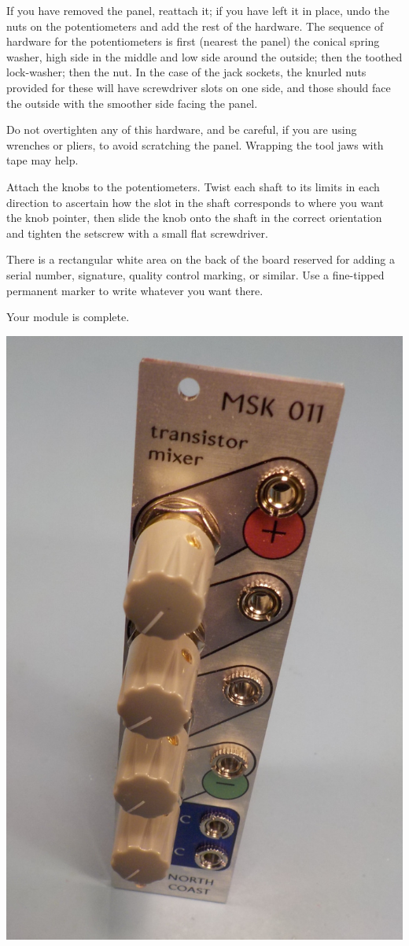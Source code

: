 If you have removed the panel, reattach it; if you have left it in place,
undo the nuts on the potentiometers and add the rest of the hardware.
The sequence of hardware for the potentiometers is first (nearest
the panel) the conical spring washer, high side in the middle and low side
around the outside; then the toothed lock-washer; then the nut.
In the case of the jack sockets, the knurled nuts provided for these will
have screwdriver slots on one side, and those should face the outside with
the smoother side facing the panel.

Do not overtighten any of this hardware, and be careful, if you are
using wrenches or pliers, to avoid scratching the panel.  Wrapping the tool
jaws with tape may help.

Attach the knobs to the potentiometers.  Twist each shaft to its limits in
each direction to ascertain how the slot in the shaft corresponds to where
you want the knob pointer, then slide the knob onto the shaft in the correct
orientation and tighten the setscrew with a small flat screwdriver.

There is a rectangular white area on the back of the board
reserved for adding a serial number, signature, quality control marking, or
similar.  Use a fine-tipped permanent marker to write whatever you want
there.

Your module is complete.

\nopagebreak
\noindent\includegraphics[width=\linewidth]{finished-module.jpg}
